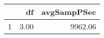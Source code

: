 \begin{table}[h]
\centering
\begin{tabular}{rrr}
  \hline
 & df & avgSampPSec \\ 
  \hline
1 & 3.00 & 9962.06 \\ 
   \hline
\end{tabular}
\end{table}
